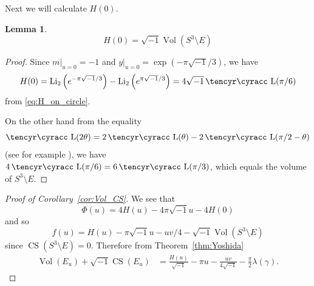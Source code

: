 \documentclass[a4paper]{amsart}
\def\cyr{\tencyr\cyracc}
\theoremstyle{plain}
\newtheorem{lem}[thm]{Lemma}
\theoremstyle{definition}
\theoremstyle{remark}
\newcommand{\Vol}{\operatorname{Vol}}
\newcommand{\CS}{\operatorname{CS}}
\newcommand{\Lob}{\operatorname{\text{\cyr L}}}
\newcommand{\Li}{\operatorname{Li}}
\numberwithin{equation}{section}
\begin{document}
\par
Next we will calculate $H(0)$.
\begin{lem}
\begin{equation*}
  H(0)=\sqrt{-1}\Vol\left(S^3\setminus{E}\right)
\end{equation*}
\end{lem}
\begin{proof}
Since $m\bigr|_{u=0}=-1$ and $y\bigr|_{u=0}=\exp(-\pi\sqrt{-1}/3)$, we have
\begin{equation*}
  H(0)
  =
   \Li_2\left(e^{-\pi\sqrt{-1}/3}\right)
  -\Li_2\left(e^{ \pi\sqrt{-1}/3}\right)
  =
  4\sqrt{-1}\Lob(\pi/6)
\end{equation*}
from \eqref{eq:H_on_circle}.
\par
On the other hand from the equality
\begin{equation*}
  \Lob(2\theta)=2\Lob(\theta)-2\Lob(\pi/2-\theta)
\end{equation*}
(see for example \cite[Lemma 1]{Milnor:BULAM382}),
we have $4\Lob(\pi/6)=6\Lob(\pi/3)$, which equals the volume of
$S^3\setminus{E}$.
\end{proof}
\begin{proof}[Proof of Corollary~\ref{cor:Vol_CS}]
We see that
\begin{equation*}
  \Phi(u)
  =
  4H(u)-4\pi\sqrt{-1}u-4H(0)
\end{equation*}
and so
\begin{equation*}
  f(u)
  =
  H(u)-\pi\sqrt{-1}u-uv/4-\sqrt{-1}\Vol\left(S^3\setminus{E}\right)
\end{equation*}
since $\CS\left(S^3\setminus{E}\right)=0$.
Therefore from Theorem~\ref{thm:Yoshida}
\begin{equation*}
\begin{split}
  \Vol\left(E_{u}\right)+\sqrt{-1}\CS\left(E_{u}\right)
  &=
  \frac{H(u)}{\sqrt{-1}}
  -\pi{u}
  -\frac{uv}{4\sqrt{-1}}
  -\frac{\pi}{2}\lambda(\gamma).
\end{split}
\end{equation*}
\end{proof}
\end{document}
